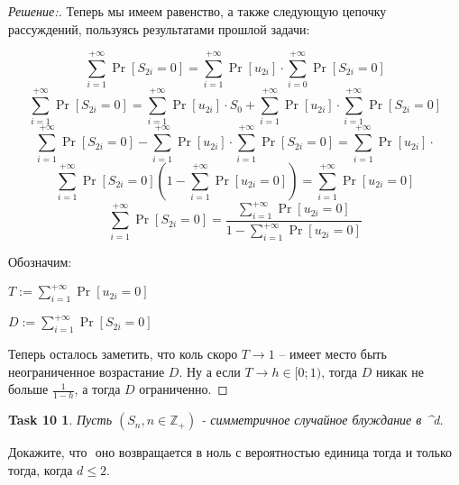 \documentclass{article}
\newtheorem*{task10}{Task 10}
\newcommand{\Z}{\mathbb{Z}}
\begin{document}
\begin{proof} [Решение:]
    Теперь мы имеем равенство, а также следующую цепочку рассуждений, пользуясь результатами прошлой задачи:
    
    \[
    \sum_{i=1}^{+\infty} \Pr[S_{2i} = 0] = \sum_{i=1}^{+\infty} \Pr[u_{2i}] \cdot \sum_{i=0}^{+\infty} \Pr[S_{2i} = 0]
    \]
    \[
    \sum_{i=1}^{+\infty} \Pr[S_{2i} = 0] = \sum_{i=1}^{+\infty} \Pr[u_{2i}] \cdot S_0 + \sum_{i=1}^{+\infty} \Pr[u_{2i}] \cdot \sum_{i=1}^{+\infty} \Pr[S_{2i} = 0]
    \]
    \[
    \sum_{i=1}^{+\infty} \Pr[S_{2i} = 0] - \sum_{i=1}^{+\infty} \Pr[u_{2i}] \cdot \sum_{i=1}^{+\infty} \Pr[S_{2i} = 0] =
    \sum_{i=1}^{+\infty} \Pr[u_{2i}] \cdot
    \]
    \[
    \sum_{i=1}^{+\infty} \Pr[S_{2i} = 0] (1 - \sum_{i=1}^{+\infty} \Pr[u_{2i} = 0]) = \sum_{i=1}^{+\infty} \Pr[u_{2i} = 0]
    \]
    \[
    \sum_{i=1}^{+\infty} \Pr[S_{2i} = 0] = \frac{\sum_{i=1}^{+\infty} \Pr[u_{2i} = 0]}{1 - \sum_{i=1}^{+\infty} \Pr[u_{2i} = 0]}
    \]
    
    Обозначим:
    
    $T:= \sum_{i=1}^{+\infty} \Pr[u_{2i} = 0]$
    
    $D := \sum_{i=1}^{+\infty} \Pr[S_{2i} = 0]$
    
    \vspace{\baselineskip}
    
    Теперь осталось заметить, что коль скоро $T \rightarrow 1$ -- имеет место быть неограниченное возрастание $D$. Ну а если $T \rightarrow h \in [0;1)$, тогда $D$ никак не больше $\frac{1}{1 - h}$, а тогда $D$ ограниченно.
    
    
        \end{proof}
    
    
    \vspace{\baselineskip}
    
    \begin{task10}
            Пусть $(S_n, n\in \Z_+)$ - симметричное случайное блуждание в ^d.
        \end{task10}
        Докажите, что $ $ оно возвращается в ноль с вероятностью единица тогда и только тогда, когда $d \leq 2$.
        
\end{document}
